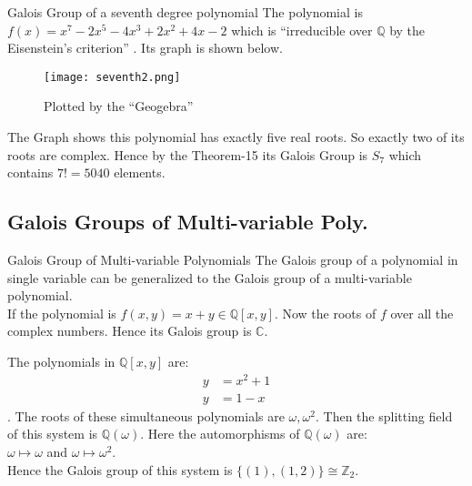 \documentclass{beamer}
\begin{document}
\begin{frame}{Galois Group of a seventh degree polynomial}
  The polynomial is \(f(x)=x^7-2x^5-4x^3+2x^2+4x-2\) which is ``irreducible over \(\mathbb{Q}\) by the Eisenstein's criterion'' \cite{hunger}. Its graph is shown below.

  \begin{figure}[h!]
    \texttt{[image: seventh2.png]}
    \caption{\footnotesize Plotted by the ``Geogebra''}
  \end{figure}

  The Graph shows this polynomial has exactly five real roots. So exactly two of its roots are complex. Hence by the Theorem-15 its Galois Group is \(S_7\) which contains \(7!=5040\) elements.
\end{frame}

\subsection{Galois Groups of Multi-variable Poly.}
\begin{frame}{Galois Group of Multi-variable Polynomials}
  The Galois group of a polynomial in single variable can be generalized to the Galois group of a multi-variable polynomial.\\[3mm]
If the polynomial is \(f(x,y)=x+y \in \mathbb{Q}[x,y]\). Now the roots of \(f\) over all the complex numbers. Hence its Galois group is \(\mathbb{C}\).


\vspace{2mm}
 \begin{tcolorbox}[colframe=brown!80!black, boxsep=1mm, title={\bfseries \color{white} Example}]
  The polynomials in \(\mathbb{Q}[x,y]\) are: \begin{align}
                         y &= x^2+1 \\
                         y&=1-x
                       \end{align}.
                       The roots of these simultaneous polynomials are \(\omega, {\omega}^2\). Then the splitting field of this system is \(\mathbb{Q}(\omega)\). Here the automorphisms of \(\mathbb{Q}(\omega)\) are: \\
       \(\omega \longmapsto \omega\) and \hspace{9mm} \(\omega \longmapsto {\omega}^2\).\\
                       Hence the Galois group of this system is \(\{(1), (1,2)\} \cong {\mathbb{Z}}_2\).
\end{tcolorbox}

\end{frame}
\end{document}
